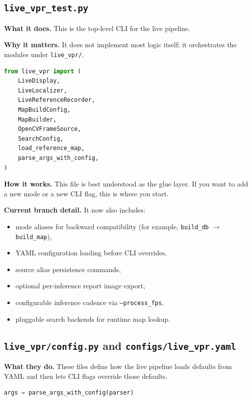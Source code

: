 \documentclass[11pt]{article}
\newcommand{\file}[1]{\texttt{#1}}
\begin{document}
\subsection{\file{live\_vpr\_test.py}}
\textbf{What it does.} This is the top-level CLI for the live pipeline.

\textbf{Why it matters.} It does not implement most logic itself; it orchestrates the modules under \file{live\_vpr/}.

\begin{lstlisting}[style=repo, language=Python, caption={The live CLI wires together modular components}]
from live_vpr import (
    LiveDisplay,
    LiveLocalizer,
    LiveReferenceRecorder,
    MapBuildConfig,
    MapBuilder,
    OpenCVFrameSource,
    SearchConfig,
    load_reference_map,
    parse_args_with_config,
)
\end{lstlisting}

\textbf{How it works.} This file is best understood as the glue layer. If you want to add a new mode or a new CLI flag, this is where you start.

\textbf{Current branch detail.} It now also includes:
\begin{itemize}[leftmargin=*]
  \item mode aliases for backward compatibility (for example, \texttt{build\_db} $\rightarrow$ \texttt{build\_map}),
  \item YAML configuration loading before CLI overrides,
  \item source alias persistence commands,
  \item optional per-inference report image export,
  \item configurable inference cadence via \texttt{--process\_fps},
  \item pluggable search backends for runtime map lookup.
\end{itemize}

\subsection{\file{live\_vpr/config.py} and \file{configs/live\_vpr.yaml}}
\textbf{What they do.} These files define how the live pipeline loads defaults from YAML and then lets CLI flags override those defaults.

\begin{lstlisting}[style=repo, language=Python, caption={Config-first argument parsing}]
args = parse_args_with_config(parser)
\end{lstlisting}
\end{document}
